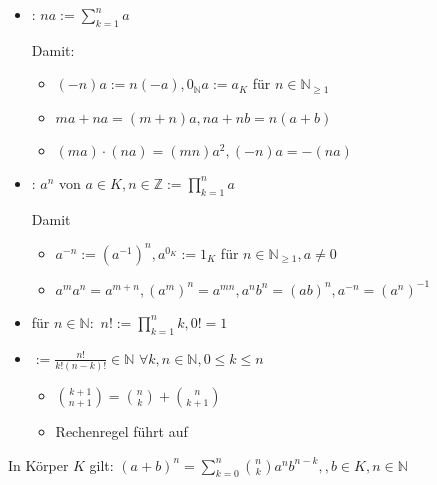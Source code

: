 \begin{*definition}
	\begin{itemize}
	\item {}: $na := \sum_{k=1}^{n}a$
	
	Damit:
	\begin{itemize}
		\item $(-n)a := n(-a), 0_\mathbb{N} a := a_K$ für $n\in\mathbb{N}_{\ge 1}$
		\item $ma + na = (m+n)a, na + nb = n(a+b)$
		\item $(ma)\cdot(na) = (mn)a^2, (-n)a = -(na)$
	\end{itemize}
	\item {}: $a^n$ von $a\in K, n\in\mathbb{Z}:=\prod_{k=1}^{n} a$
	
	Damit
	\begin{itemize}
		\item $a^{-n} :=(a^{-1})^n, a^{0_K}:=1_K$ für $n\in\mathbb{N}_{\ge 1}, a\neq 0$
		\item $a^m a^n = a^{m+n}, (a^m)^n = a^{mn}, a^nb^n = (ab)^n, a^{-n} = (a^n)^{-1}$
	\end{itemize}
	\item {} für $n\in\mathbb{N}:$ $n!:=\prod_{k=1}^n k, 0!=1$
	\item {} $:=\frac{n!}{k!(n-k)!}\in\mathbb{N}$ $\forall k,n\in\mathbb{N}, 0\le k\le n$
	\begin{itemize}
		\item $\binom{k+1}{n+1} = \binom{n}{k} + \binom{n}{k+1}$
		\item Rechenregel führt auf 
	\end{itemize}
	\end{itemize}
\end{*definition}

\begin{proposition}
	In Körper $K$ gilt: $(a+b)^n = \sum_{k=0}^n\binom{n}{k}a^n b^{n-k}, ,b\in K, n\in\mathbb{N}$
\end{proposition}

